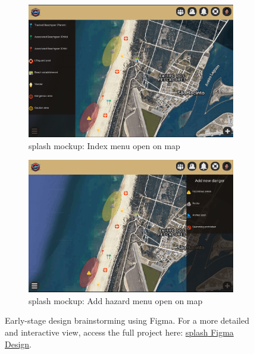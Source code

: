 \begin{figure}[H]
    \centering
    \begin{subfigure}{0.48\textwidth}
        \centering
        \includegraphics[width=\linewidth]{figs/Mockups/MAP_index.png}
        \caption{\ac{splash} mockup: Index menu open on map}
        \label{fig:figma_map_index}
    \end{subfigure}
    \hfill
    \begin{subfigure}{0.48\textwidth}
        \centering
        \includegraphics[width=\linewidth]{figs/Mockups/MAP_add1.png}
        \caption{\ac{splash} mockup: Add hazard menu open on map}
        \label{fig:figma_hazard_menu}
    \end{subfigure}
    \caption{Early-stage design brainstorming using Figma. For a more detailed and interactive view, access the full project here: \href{https://www.figma.com/design/73s1I8BXApUguw381t41PD/SPLASH?node-id=9-87&t=9a5nUxewcWEebZo4-1}{\ac{splash} Figma Design}.}
    \label{fig:figma_prototype}
\end{figure}

